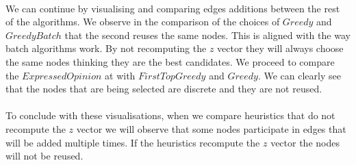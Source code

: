 \\
\clearpage

\noindent We can continue by visualising and comparing edges additions between the rest of the algorithms. We observe in the comparison of the choices of $Greedy$ and $GreedyBatch$ that the second reuses the same nodes. This is aligned with the way batch algorithms work. By not recomputing the $z$ vector they will always choose the same nodes thinking they are the best candidates. We proceed to compare the $ExpressedOpinion$ at with $FirstTopGreedy$ and $Greedy$. We can clearly see that the nodes that are being selected are discrete and they are not reused. 
\\
\\
To conclude with these visualisations, when we compare heuristics that do not recompute the $z$ vector we will observe that some nodes participate in edges that will be added multiple times. If the heuristics recompute the $z$ vector the nodes will not be reused.
\\
\\

